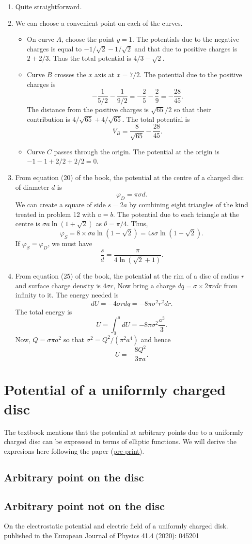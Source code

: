 \documentclass{article}
\begin{document}
\begin{enumerate}
\item Quite straightforward.

\item We can choose a convenient point on each of the curves. 
\begin{itemize}
\item On curve $A$, choose the point $y = 1$. The potentials due to the negative
charges is equal to $-1/\sqrt{2} - 1/\sqrt{2}$ and that due to positive charges
is $2 + 2/3$. Thus the total potential is $4/3 - \sqrt{2}$.
\item Curve $B$ crosses the $x$ axis at $x = 7/2$. The potential due to the
positive charges is
\[
-\frac{1}{5/2} - \frac{1}{9/2} = -\frac{2}{5} - \frac{2}{9} = -\frac{28}{45}.
\]
The distance from the positive charges is $\sqrt{65}/2$ so that their contribution
is $4/\sqrt{65} + 4/\sqrt{65}$. The total potential is
\[
V_B = \frac{8}{\sqrt{65}} - \frac{28}{45}.
\]
\item Curve $C$ passes through the origin. The potential at the origin is $-1
-1 + 2/2 + 2/2 = 0$. 
\end{itemize}

\item From equation (20) of the book, the potential at the centre of a charged
disc of diameter $d$ is
\[
\varphi_D = \pi\sigma d.
\]
We can create a square of side $s = 2a$ by combining eight triangles of the kind
treated in problem 12 with $a = b$. The potential due to each triangle at the 
centre is $\sigma a \ln(1 + \sqrt{2})$ as $\theta = \pi/4$. Thus,
\[
\varphi_S = 8 \times \sigma a \ln(1 + \sqrt{2}) = 4s\sigma\ln(1 + \sqrt{2}).
\]
If $\varphi_S = \varphi_D$, we must have
\[
\frac{s}{d} = \frac{\pi}{4\ln(\sqrt{2} + 1)}.
\]

\item From equation (25) of the book, the potential at the rim of a disc of radius
$r$ and surface charge density is $4\sigma r$, Now bring a charge $dq = \sigma 
\times 2\pi rdr$ from infinity to it. The energy needed is
\[
dU = -4\sigma r dq = -8\pi\sigma^2 r^2 dr.
\]
The total energy is
\[
U = \int_0^a dU = -8\pi\sigma^2\frac{a^3}{3}.
\]
Now, $Q = \sigma \pi a^2$ so that $\sigma^2 = Q^2/(\pi^2 a^4)$ and hence
\[
U = -\frac{8Q^2}{3\pi a}.
\]
\end{enumerate}

\section{Potential of a uniformly charged disc}
The textbook mentions that the potential at arbitrary points due to a uniformly
charged disc can be expressed in terms of elliptic functions. We will derive the
expresions here following the paper (\href{https://arxiv.org/pdf/2004.04540}{pre-print})\cite{bs}.
\subsection{Arbitrary point on the disc}
\subsection{Arbitrary point not on the disc}

\begin{thebibliography}{1}
 On the electrostatic potential and electric field of a uniformly charged disk.
published in the European Journal of Physics 41.4 (2020): 045201
\end{thebibliography}
\end{document}

